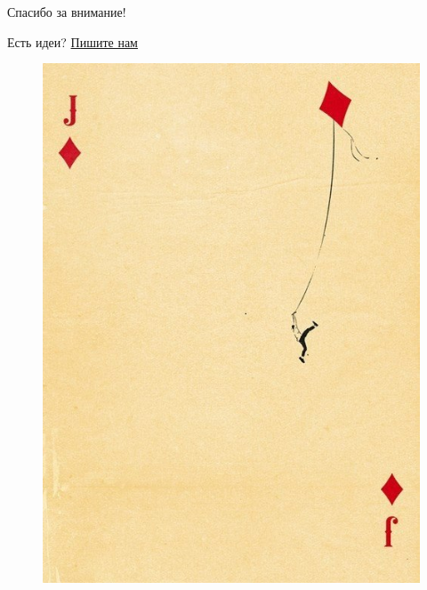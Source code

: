 \documentclass{ideas}
\begin{document}
\vspace*{\fill}
\begin{center}
    \large 
    Спасибо за внимание!

    \vspace{2em}
    Есть идеи?
    \href{mailto:anto-kha0@rambler.ru}{Пишите нам}
\end{center}
\vfill
\thispagestyle{empty}
\newpage
\begin{figure}[ht!]
    \centering
    \includegraphics[width=\textwidth]{Intheend}
\end{figure}
\end{document}
